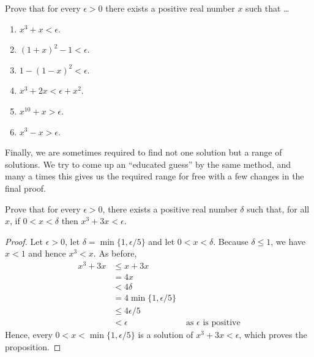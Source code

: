 \begin{exercise}
	Prove that for every $\epsilon > 0$ there exists a positive real number $x$ such that \dots
		\begin{enumerate}
			\item  $x ^ 3 + x < \epsilon$.
			\item  $(1 + x)^2 - 1 < \epsilon$.
			\item $1 - (1 - x)^2 < \epsilon$.
			\item  $x ^ 3 + 2x < \epsilon + x^2$.
			\item  $x^{10} + x > \epsilon $.
			\item  $x^3 - x > \epsilon $.
						\\
		\end{enumerate}
\end{exercise}

Finally, we are sometimes required to find not one solution but a range of solutions. We try to come up an ``educated guess'' by the same method, and many a times this gives us the required range for free with a few changes in the final proof.

\begin{q}
	\label{q:sample_problem_inequality_2}
	Prove that for every $\epsilon > 0$, there exists a positive real number $\delta$ such that, for all $x$, if $0 < x < \delta$ then $x^3 + 3x < \epsilon$.
\end{q}
\begin{proof}
	Let $\epsilon > 0$, let $\delta = \min \{ 1, \epsilon/5\}$ and let $ 0 < x < \delta$. Because $\delta \le 1$, we have $x < 1$ and hence $x^3 < x$. As before,
	\begin{align*}
		x^3 + 3x
		&\le x + 3x \\
		&= 4x \\
		&< 4 \delta \\
		&= 4 \min  \{ 1, {\epsilon}/{5}\} \\
		&\le 4 \epsilon /5 \\
		&< \epsilon& \mbox{ as $\epsilon$ is positive}
	\end{align*}
	Hence, every $0 < x <  \min \{ 1, \epsilon/5\}$ is a solution of $x^3 + 3x < \epsilon$, which proves the proposition.
\end{proof}


